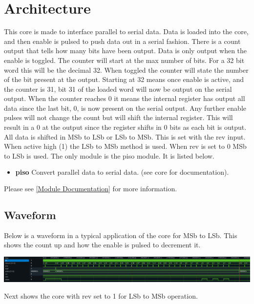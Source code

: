 \section{Architecture}
\par
This core is made to interface parallel to serial data. Data is loaded into the core, and then enable is pulsed to
push data out in a serial fashion. There is a count output that tells how many bits have been output. Data is only output
when the enable is toggled. The counter will start at the max number of bits. For a 32 bit word this will be the decimal 32.
When toggled the counter will state the number of the bit present at the output. Starting at 32 means once enable is active,
and the counter is 31, bit 31 of the loaded word will now be output on the serial output. When the counter reaches 0 it means
the internal register has output all data since the last bit, 0, is now present on the serial output. Any further enable
pulses will not change the count but will shift the internal register. This will result in a 0 at the output since the register
shifts in 0 bits as each bit is output. All data is shifted in MSb to LSb or LSb to MSb. This is set with the rev input.
When active high (1) the LSb to MSb method is used. When rev is set to 0 MSb to LSb is used.
The only module is the piso module. It is listed below.

\begin{itemize}
  \item \textbf{piso} Convert parallel data to serial data. (see core for documentation).
\end{itemize}

Please see \ref{Module Documentation} for more information.

\subsection{Waveform}
\par
Below is a waveform in a typical application of the core for MSb to LSb. This shows the count up and how the enable is pulsed to decrement it.

\includegraphics[width=\textwidth]{img/diagrams/waveform_rev0.png}

\par
Next shows the core with rev set to 1 for LSb to MSb operation.

